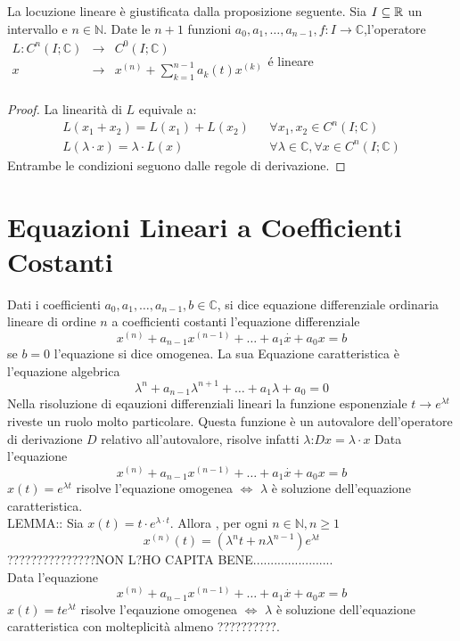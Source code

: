 \observation
La locuzione lineare è giustificata dalla proposizione seguente.
\proposition
Sia $I\subseteq \mathbb{R}$ un intervallo e $n\in\mathbb{N}$. Date le $n+1$ funzioni $a_0,a_1,\ldots,a_{n-1},f:I\to\mathbb{C}$,l'operatore 
$\begin{array}{rcl} 
L: C^n(I;\mathbb{C}) & \to & C^0(I;\mathbb{C}) \\
x & \to & x^{(n)}+\sum\limits_{k=1}^{n-1}a_k(t)x^{(k)} \\ 
\end{array}$\'e lineare
\begin{proof}
	La linearità di $L$ equivale a:
	$$ \begin{matrix}L(x_1+x_2)=L(x_1)+L(x_2) && \forall x_1,x_2\in C^n(I;\mathbb{C})\\L(\lambda\cdot x)=\lambda\cdot L(x) && \forall\lambda\in\mathbb{C}, \forall x\in C^n(I;\mathbb{C})\end{matrix} $$
	Entrambe le condizioni  seguono dalle regole di derivazione.
\end{proof}
\section{Equazioni Lineari a Coefficienti Costanti}
Dati i coefficienti $a_0,a_1,\ldots,a_{n-1},b\in\mathbb{C}$, si dice equazione differenziale ordinaria lineare di ordine $n$ a coefficienti costanti l'equazione differenziale
$$x^{(n)}+a_{n-1}x^{(n-1)}+\ldots+a_1\overset{\cdot}{x}+a_0x=b$$
se $b=0$ l'equazione si dice omogenea. La sua Equazione caratteristica è l'equazione algebrica
$$\lambda^n+a_{n-1}\lambda^{n+1}+\ldots+a_1\lambda+a_0=0$$ 
\observation
Nella risoluzione di eqauzioni differenziali lineari la funzione esponenziale $t\to e^{\lambda t}$ riveste un ruolo molto particolare. Questa funzione è un autovalore dell'operatore di derivazione $D$ relativo all'autovalore, risolve infatti $\lambda$:$Dx=\lambda\cdot x$ 
\proposition
Data l'equazione
$$x^{(n)}+a_{n-1}x^{(n-1)}+\ldots+a_1\overset{\cdot}{x}+a_0x=b$$
$x(t)=e^{\lambda t}$ risolve l'equazione omogenea $\Leftrightarrow$ $\lambda$ è soluzione dell'equazione caratteristica.\\

LEMMA:: Sia $x(t)=t\cdot e^{\lambda\cdot t}$. Allora , per ogni $n\in\mathbb{N}, n\ge 1$
$$x^{(n)}(t)=\left(\lambda^nt+n\lambda^{n-1}\right)e^{\lambda t}$$
???????????????NON L?HO CAPITA BENE.......................\\
\proposition
Data l'equazione 
$$x^{(n)}+a_{n-1}x^{(n-1)}+\ldots+a_1\overset{\cdot}{x}+a_0x=b$$
$x(t)=te^{\lambda t}$ risolve l'eqauzione omogenea $\Leftrightarrow$ $\lambda$ è soluzione dell'equazione caratteristica con molteplicità almeno ??????????.






